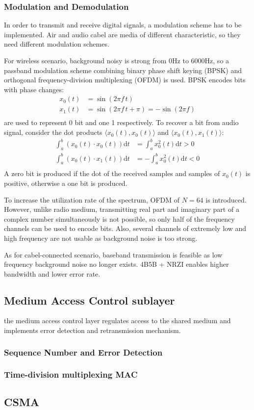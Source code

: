 \subsubsection{Modulation and Demodulation}
In order to transmit and receive digital signals, a modulation scheme has to be implemented.
Air and audio cabel are media of different characteristic, so they need different modulation schemes.\par
For wireless scenario, background noisy is strong from 0Hz to 6000Hz,
so a passband modulation scheme
combining binary phase shift keying (BPSK) and orthogonal frequency-division multiplexing (OFDM)
is used.
BPSK encodes bits with phase changes:
\begin{align*}
	x_0(t) & =\sin(2\pi f\, t)                       \\
	x_1(t) & =\sin(2\pi f\, t + \pi) = -\sin(2\pi f) \\
\end{align*}
are used to represent 0 bit and one 1 respectively.
To recover a bit from audio signal, consider the dot products $\langle x_0(t),x_0(t)\rangle$ and $\langle x_0(t),x_1(t) \rangle$:
\begin{align*}
	\int_a^b \left( x_0(t)\cdot x_0(t) \right) \mathrm{d}t & =  \int_a^b x_0^2(t) \mathrm{d}t > 0 \\
	\int_a^b \left( x_0(t)\cdot x_1(t) \right) \mathrm{d}t & = -\int_a^b x_0^2(t) \mathrm{d}t < 0 \\
\end{align*}
A zero bit is produced if the dot of the received samples and samples of $x_0(t)$ is positive, otherwise a one bit is produced.\par
To increase the utilization rate of the spectrum, OFDM of $N=64$ is introduced.
However, unlike radio medium, transmitting real part and imaginary part of a complex number simultaneously is not possible,
so only half of the frequency channels can be used to encode bits.
Also, several channels of extremely low and high frequency are not usable as background noise is too strong.\par
As for cabel-connected scenario, baseband transmission is feasible as low frequency background noise no longer exists.
4B5B + NRZI enables higher bandwidth and lower error rate.

\subsection{Medium Access Control sublayer}
the medium access control layer regulates access to the shared medium and implements error detection and retransmission mechanism.

\subsubsection{Sequence Number and Error Detection}

\subsubsection{Time-division multiplexing MAC}

\subsection{CSMA}
